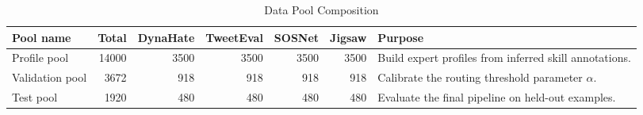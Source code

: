 
\begin{table}[htbp]
\centering
\caption{Data Pool Composition}
\label{tab:data-pool-composition}
\small
\begin{tabular}{p{2.3cm} r r r r r p{4.0cm}}
\toprule
Pool name & Total & DynaHate & TweetEval & SOSNet & Jigsaw & Purpose \\
\midrule
Profile pool & 14000 & 3500 & 3500 & 3500 & 3500 & Build expert profiles from inferred skill annotations. \\
Validation pool & 3672 & 918 & 918 & 918 & 918 & Calibrate the routing threshold parameter $\alpha$. \\
Test pool & 1920 & 480 & 480 & 480 & 480 & Evaluate the final pipeline on held-out examples. \\
\bottomrule
\end{tabular}
\end{table}
